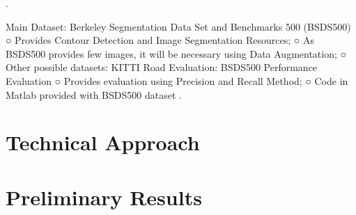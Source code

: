 \documentclass[10pt,twocolumn,letterpaper]{article}
\begin{document}
\cite{VGGNET} \cite{UNET}.

Main Dataset: Berkeley Segmentation Data Set and Benchmarks 500 (BSDS500)
○ Provides Contour Detection and Image Segmentation Resources;
○ As BSDS500 provides few images, it will be necessary using Data Augmentation;
○ Other possible datasets: KITTI Road
Evaluation: BSDS500 Performance Evaluation
○ Provides evaluation using Precision and Recall Method;
○ Code in Matlab provided with BSDS500 dataset \cite{BSDS500}.

\section{Technical Approach} \label{sec:tech_approach}

\section{Preliminary Results} \label{sec:results}


{\small


}
\end{document}
